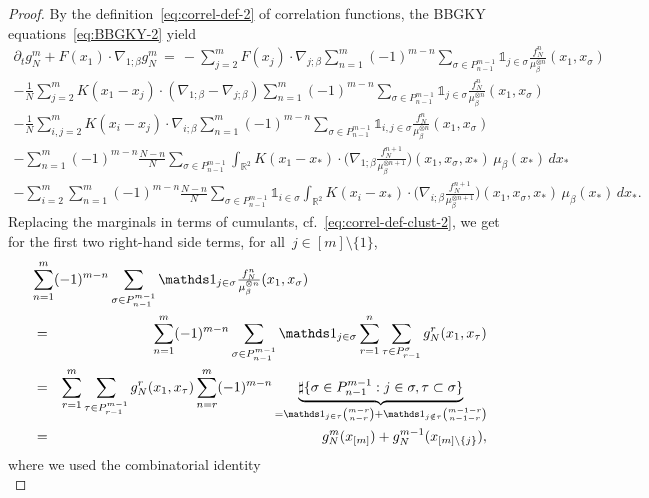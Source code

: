 \documentclass[a4paper,11pt,reqno,noindent]{amsart}
\theoremstyle{plain}
\numberwithin{equation}{section}
\newcommand{\R}{\mathbb R}
\newcommand{\3}{|\!|\!|}
\begin{document}
\begin{proof}
By the definition~\eqref{eq:correl-def-2} of correlation functions, the BBGKY equations~\eqref{eq:BBGKY-2} yield
\begin{multline}\label{eq:eqn-gNm-0-2}
\partial_t g_N^m
+F(x_1)\cdot\nabla_{1;\beta}g_N^m
\,=\,-\sum_{j=2}^mF(x_j)\cdot\nabla_{j;\beta}\sum_{n=1}^m(-1)^{m-n}\sum_{\sigma\in P_{n-1}^{m-1}}\mathds1_{j\in\sigma}\tfrac{f_N^n}{\mu_\beta^{\otimes n}}(x_1,x_\sigma)\\
-\tfrac1N\sum_{j=2}^mK(x_1-x_j)\cdot(\nabla_{1;\beta}-\nabla_{j;\beta})\sum_{n=1}^m(-1)^{m-n}\sum_{\sigma\in P_{n-1}^{m-1}}\mathds1_{j\in\sigma}\tfrac{f_N^n}{\mu_\beta^{\otimes n}}(x_1,x_\sigma)\\
-\tfrac1N\sum_{i,j=2}^mK(x_i-x_j)\cdot\nabla_{i;\beta}\sum_{n=1}^m(-1)^{m-n}\sum_{\sigma\in P_{n-1}^{m-1}}\mathds1_{i,j\in\sigma}\tfrac{f_N^n}{\mu_\beta^{\otimes n}}(x_1,x_\sigma)\\
-\sum_{n=1}^m(-1)^{m-n}\tfrac{N-n}{N}\sum_{\sigma\in P_{n-1}^{m-1}}\int_{\R^2}K(x_1-x_*)\cdot\Big(\nabla_{1;\beta}\tfrac{f_N^{n+1}}{\mu_\beta^{\otimes n+1}}\Big)(x_1,x_\sigma,x_*)\,\mu_\beta(x_*)\,dx_*\\
-\sum_{i=2}^m\sum_{n=1}^m(-1)^{m-n}\tfrac{N-n}{N}\sum_{\sigma\in P_{n-1}^{m-1}}\mathds1_{i\in\sigma}\int_{\R^2}K(x_i-x_*)\cdot\Big(\nabla_{i;\beta}\tfrac{f_N^{n+1}}{\mu_\beta^{\otimes n+1}}\Big)(x_1,x_\sigma,x_*)\,\mu_\beta(x_*)\,dx_*.
\end{multline}
Replacing the marginals in terms of cumulants, cf.~\eqref{eq:correl-def-clust-2}, we get for the first two right-hand side terms, for all~$j\in[m]\setminus\{1\}$,
\begin{eqnarray}
\lefteqn{\sum_{n=1}^m(-1)^{m-n}\sum_{\sigma\in P_{n-1}^{m-1}}\mathds1_{j\in\sigma}\tfrac{f_N^n}{\mu_\beta^{\otimes n}}(x_1,x_{\sigma})}\nonumber\\
&=&\sum_{n=1}^m(-1)^{m-n}\sum_{\sigma\in P_{n-1}^{m-1}}\mathds1_{j\in\sigma}\sum_{r=1}^{n}\sum_{\tau\in P_{r-1}^{\sigma}}g_N^r(x_1,x_{\tau})\nonumber\\
&=&\sum_{r=1}^{m}\sum_{\tau\in P_{r-1}^{m-1}} g_N^r(x_1,x_{\tau})\sum_{n=r}^m(-1)^{m-n}
\underbrace{\sharp\{\sigma\in P_{n-1}^{m-1}:j\in\sigma,\tau\subset\sigma\}}_{=\mathds1_{j\in\tau}\binom{m-r}{n-r}+\mathds1_{j\notin\tau}\binom{m-1-r}{n-1-r}}\nonumber\\
&=&g_N^m(x_{[m]})+g_N^{m-1}(x_{[m]\setminus\{j\}}),\label{eq:marg-cumul-combi}
\end{eqnarray}
where we used the combinatorial identity
\begin{equation}\label{eq:combin-ide}

\end{equation}
\end{proof}
\end{document}
